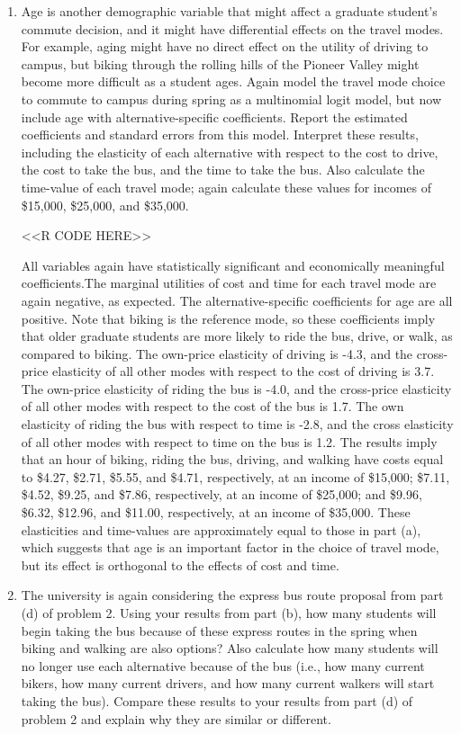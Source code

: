 \documentclass[11pt,letterpaper]{article}
\begin{document}
\begin{enumerate}[label=\alph*., leftmargin=*]
	\item Age is another demographic variable that might affect a graduate student's commute decision, and it might have differential effects on the travel modes. For example, aging might have no direct effect on the utility of driving to campus, but biking through the rolling hills of the Pioneer Valley might become more difficult as a student ages. Again model the travel mode choice to commute to campus during spring as a multinomial logit model, but now include age with alternative-specific coefficients. Report the estimated coefficients and standard errors from this model. Interpret these results, including the elasticity of each alternative with respect to the cost to drive, the cost to take the bus, and the time to take the bus. Also calculate the time-value of each travel mode; again calculate these values for incomes of \$15,000, \$25,000, and \$35,000.

	<<R CODE HERE>>

	All variables again have statistically significant and economically meaningful coefficients.The marginal utilities of cost and time for each travel mode are again negative, as expected. The alternative-specific coefficients for age are all positive. Note that biking is the reference mode, so these coefficients imply that older graduate students are more likely to ride the bus, drive, or walk, as compared to biking. The own-price elasticity of driving is -4.3, and the cross-price elasticity of all other modes with respect to the cost of driving is 3.7. The own-price elasticity of riding the bus is -4.0, and the cross-price elasticity of all other modes with respect to the cost of the bus is 1.7. The own elasticity of riding the bus with respect to time is -2.8, and the cross elasticity of all other modes with respect to time on the bus is 1.2. The results imply that an hour of biking, riding the bus, driving, and walking have costs equal to \$4.27, \$2.71, \$5.55, and \$4.71, respectively, at an income of \$15,000; \$7.11, \$4.52, \$9.25, and \$7.86, respectively, at an income of \$25,000; and \$9.96, \$6.32, \$12.96, and \$11.00, respectively, at an income of \$35,000.  These elasticities and time-values are approximately equal to those in part (a), which suggests that age is an important factor in the choice of travel mode, but its effect is orthogonal to the effects of cost and time. 

	\item The university is again considering the express bus route proposal from part (d) of problem 2. Using your results from part (b), how many students will begin taking the bus because of these express routes in the spring when biking and walking are also options? Also calculate how many students will no longer use each alternative because of the bus (i.e., how many current bikers, how many current drivers, and how many current walkers will start taking the bus). Compare these results to your results from part (d) of problem 2 and explain why they are similar or different.


\end{enumerate}
\end{document}
